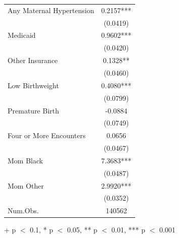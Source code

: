 \begin{table}[ht]
\begin{tabular}{l c}
Any Maternal Hypertension                  & 0.2157***  \\
                                           & (0.0419)   \\
Medicaid                                   & 0.9602***  \\
                                           & (0.0420)   \\
Other Insurance                            & 0.1328**   \\
                                           & (0.0460)   \\
Low Birthweight                            & 0.4080***  \\
                                           & (0.0799)   \\
Premature Birth                            & -0.0884    \\
                                           & (0.0749)   \\
Four or More Encounters                    & 0.0656     \\
                                           & (0.0467)   \\
Mom Black                                  & 7.3683***  \\
                                           & (0.0487)   \\
Mom Other                                  & 2.9920***  \\
                                           & (0.0352)   \\
Num.Obs.                                   & 140562     \\ \bottomrule
\end{tabular}
\small
\noindent + p $<$ 0.1, * p $<$ 0.05, ** p $<$ 0.01, *** p $<$ 0.001
\label{propensity_model}
\end{table}
